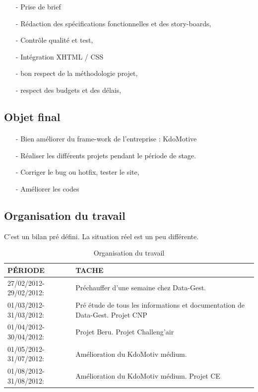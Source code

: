 \begin{itemize}
  \item [-]Prise de brief 
  \item [-]Rédaction des spécifications fonctionnelles et des story-boards, 
  \item [-]Contrôle qualité et test, 
  \item [-]Intégration XHTML / CSS
  \item [-]bon respect de la méthodologie projet,
  \item [-]respect des budgets et des délais, 
\end{itemize}

\subsection{Objet final}
\paragraph{}
\begin{itemize}
\item [-] Bien améliorer du frame-work de l'entreprise : KdoMotive
\item [-] Réaliser les différents projets pendant le période de stage. 
\item [-] Corriger le bug ou hotfix, tester le site, 
\item [-] Améliorer les codes
\end{itemize}

\subsection{Organisation du travail}

C'est un bilan pré défini. La situation réel est un peu différente.  
\begin{table}[htbp]
\renewcommand{\tabularxcolumn}[1]{>{\arraybackslash}m{#1}}
\begin{tabularx}{\textwidth}{lX}
\toprule
PÉRIODE & TACHE \\
\midrule
27/02/2012-29/02/2012: &  Préchauffer d'une semaine chez Data-Gest. \\ 
\hline 
01/03/2012-31/03/2012: & Pré étude de tous les informations et documentation de Data-Gest. Projet CNP \\ 
\hline 
01/04/2012-30/04/2012: & Projet Beru. Projet Challeng'air \\ 
\hline 
01/05/2012-31/07/2012: & Amélioration du KdoMotiv médium.  \\ 
\hline 
01/08/2012-31/08/2012: & Amélioration du KdoMotiv médium. Projet CE \\ 
\bottomrule
\end{tabularx} 
 \caption{Organisation du travail}
\end{table}





